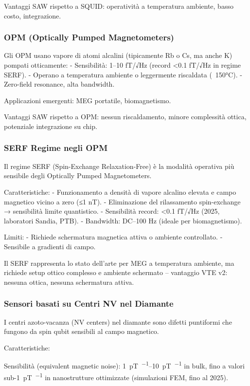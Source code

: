 \documentclass[11pt,a4paper]{article}
\begin{document}
Vantaggi SAW rispetto a SQUID: operatività a temperatura ambiente, basso costo, integrazione.

\subsubsection{OPM (Optically Pumped Magnetometers)}

Gli OPM usano vapore di atomi alcalini (tipicamente Rb o Cs, ma anche K) pompati otticamente: 
- Sensibilità: 1–10 fT/√Hz (record <0.1 fT/√Hz in regime SERF).
- Operano a temperatura ambiente o leggermente riscaldata (~150°C).
- Zero-field resonance, alta bandwidth.

Applicazioni emergenti: MEG portatile, biomagnetismo.

Vantaggi SAW rispetto a OPM: nessun riscaldamento, minore complessità ottica, potenziale integrazione su chip.

\subsubsection{SERF Regime negli OPM}

Il regime SERF (Spin-Exchange Relaxation-Free) è la modalità operativa più sensibile degli Optically Pumped Magnetometers.

Caratteristiche:
- Funzionamento a densità di vapore alcalino elevata e campo magnetico vicino a zero (≤1 nT).
- Eliminazione del rilassamento spin-exchange → sensibilità limite quantistico.
- Sensibilità record: <0.1 fT/√Hz (2025, laboratori Sandia, PTB).
- Bandwidth: DC–100 Hz (ideale per biomagnetismo).

Limiti:
- Richiede schermatura magnetica attiva o ambiente controllato.
- Sensibile a gradienti di campo.

Il SERF rappresenta lo stato dell'arte per MEG a temperatura ambiente, ma richiede setup ottico complesso e ambiente schermato – vantaggio VTE v2: nessuna ottica, nessuna schermatura attiva.

\subsubsection{Sensori basati su Centri NV nel Diamante}

I centri azoto-vacanza (NV centers) nel diamante sono difetti puntiformi che fungono da spin qubit sensibili al campo magnetico.

Caratteristiche:
\item Sensibilità (equivalent magnetic noise): 
  \SIrange{1}{10}{\pico\tesla\per\sqrthz} in bulk, 
  fino a valori sub-\SI{1}{\pico\tesla\per\sqrthz} 
  in nanostrutture ottimizzate (simulazioni FEM, fino al 2025).
\end{document}
